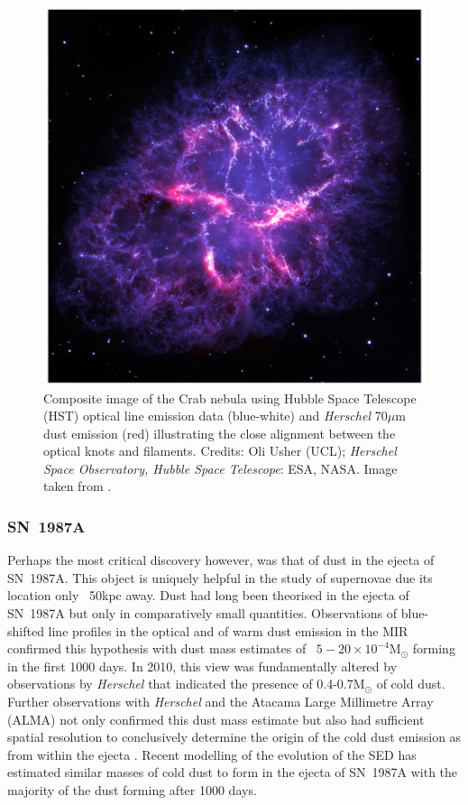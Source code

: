 \begin{figure}
\centering
\includegraphics[clip=true,scale=0.3,trim= 0 0 0 0]{chapters/chapter1/figs/Crab.png}
\caption{Composite image of the Crab nebula using Hubble Space Telescope (HST) optical line emission data (blue-white) and {\em Herschel} 70$\mu$m dust emission (red) illustrating the close alignment between the optical knots and filaments.  Credits: Oli Usher (UCL); \textit{Herschel Space Observatory, Hubble Space Telescope}: ESA, NASA.  Image taken from \citet{Owen2015}.}
\label{fig:Crab}
\end{figure}
 
 \subsubsection{SN~1987A}
 
 Perhaps the most critical discovery however, was that of dust in the ejecta of SN~1987A.  This object is uniquely helpful in the study of supernovae due its location only ~50kpc away.  Dust had long been theorised in the ejecta of SN~1987A but only in comparatively small quantities.  Observations of blue-shifted line profiles in the optical and of warm dust emission in the MIR confirmed this hypothesis with dust mass estimates of ~$5-20 \times 10^{-4}$M$_{\odot}$ forming in the first 1000 days\citep{Lucy1989,Roche1989,Bouchet1991,Wooden1993,Ercolano2007}.  In 2010, this view was fundamentally altered by observations by \textit{Herschel} that indicated the presence of 0.4-0.7M$_{\odot}$ of cold dust.  Further observations with {\em Herschel} and the Atacama Large Millimetre Array (ALMA) not only confirmed this dust mass estimate but also had sufficient spatial resolution to conclusively determine the origin of the cold dust emission as from within the ejecta \citep{Matsuura2011,Indebetouw2014,Matsuura2015}.  Recent modelling of the evolution of the SED has estimated similar masses of cold dust to form in the ejecta of SN~1987A with the majority of the dust forming after 1000 days.
 
